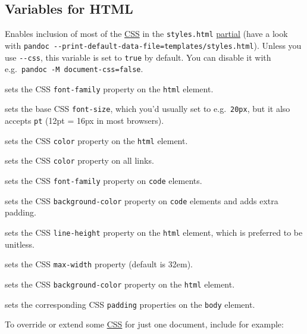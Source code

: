 \documentclass[
  b5paper
]{book}
\providecommand{\tightlist}{%
  \setlength{\itemsep}{0pt}\setlength{\parskip}{0pt}}
\begin{document}
\subsection{Variables for HTML}\label{variables-for-html}

\begin{description}
\tightlist
\item[\texttt{document-css}]
Enables inclusion of most of the
\href{https://developer.mozilla.org/en-US/docs/Learn/CSS}{CSS} in the
\texttt{styles.html} \hyperref[partials]{partial} (have a look with
\texttt{pandoc\ -\/-print-default-data-file=templates/styles.html}).
Unless you use \texttt{-\/-css}, this variable is set to \texttt{true}
by default. You can disable it with
e.g.~\texttt{pandoc\ -M\ document-css=false}.
\item[\texttt{mainfont}]
sets the CSS \texttt{font-family} property on the \texttt{html} element.
\item[\texttt{fontsize}]
sets the base CSS \texttt{font-size}, which you'd usually set to
e.g.~\texttt{20px}, but it also accepts \texttt{pt} (12pt = 16px in most
browsers).
\item[\texttt{fontcolor}]
sets the CSS \texttt{color} property on the \texttt{html} element.
\item[\texttt{linkcolor}]
sets the CSS \texttt{color} property on all links.
\item[\texttt{monofont}]
sets the CSS \texttt{font-family} property on \texttt{code} elements.
\item[\texttt{monobackgroundcolor}]
sets the CSS \texttt{background-color} property on \texttt{code}
elements and adds extra padding.
\item[\texttt{linestretch}]
sets the CSS \texttt{line-height} property on the \texttt{html} element,
which is preferred to be unitless.
\item[\texttt{maxwidth}]
sets the CSS \texttt{max-width} property (default is 32em).
\item[\texttt{backgroundcolor}]
sets the CSS \texttt{background-color} property on the \texttt{html}
element.
\item[\texttt{margin-left}, \texttt{margin-right}, \texttt{margin-top},
\texttt{margin-bottom}]
sets the corresponding CSS \texttt{padding} properties on the
\texttt{body} element.
\end{description}

To override or extend some
\href{https://developer.mozilla.org/en-US/docs/Learn/CSS}{CSS} for just
one document, include for example:
\end{document}

